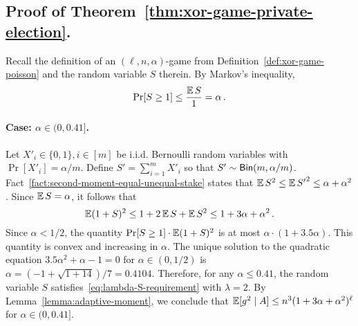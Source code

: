   \subsection{Proof of Theorem~\ref{thm:xor-game-private-election}.}
      Recall the definition of an $(\ell, n, \alpha)$-game from Definition~\ref{def:xor-game-poisson}
      and 
      the random variable $S$ therein. 
      By Markov's inequality,
      $$
          \Pr[S \geq 1] \leq \frac{\operatorname{\mathbb{E}} S}{1} = \alpha \,.
      $$

      \paragraph{Case: $\alpha \in (0, 0.41]$.}
      Let $X'_i \in \{0,1\}, i \in [m]$ be i.i.d. Bernoulli random variables 
      with $\Pr[X'_i] = \alpha/m$. 
      Define $S' = \sum_{i=1}^m X'_i$ 
      so that $S'\sim \mathsf{Bin}(m, \alpha/m)$. 
      Fact~\ref{fact:second-moment-equal-unequal-stake} states that 
      $\operatorname{\mathbb{E}} S^2 \leq \operatorname{\mathbb{E}} {S'}^2 \leq \alpha + \alpha^2$. 
      Since $\operatorname{\mathbb{E}} S = \alpha$, it follows that 
      $$
      \operatorname{\mathbb{E}} (1 + S)^2 
      \leq 1 + 2 \operatorname{\mathbb{E}} S + \operatorname{\mathbb{E}} S^2
      \leq 1 + 3 \alpha + \alpha^2
      \,.
      $$
      Since $\alpha < 1/2$, the quantity 
      $\Pr[S \geq 1] \cdot \operatorname{\mathbb{E}} (1 + S)^2$ is at most $\alpha\cdot (1 + 3.5 \alpha)$. 
      This quantity is convex and increasing in $\alpha$. 
      The unique solution to the quadratic equation $3.5 \alpha^2 + \alpha - 1 = 0$ 
      for $\alpha \in (0, 1/2)$ 
      is $\alpha = (-1 + \sqrt{1 + 14})/7 = 0.4104$. 
      Therefore, for any $\alpha \leq 0.41$, 
      the random variable $S$ satisfies~\eqref{eq:lambda-S-requirement} 
      with $\lambda = 2$.
      By Lemma~\ref{lemma:adaptive-moment}, we conclude that 
      $\operatorname{\mathbb{E}}[g^2 \mid A] \leq n^3 (1 + 3 \alpha + \alpha^2)^\ell$ 
      for $\alpha \in (0, 0.41]$.
      
